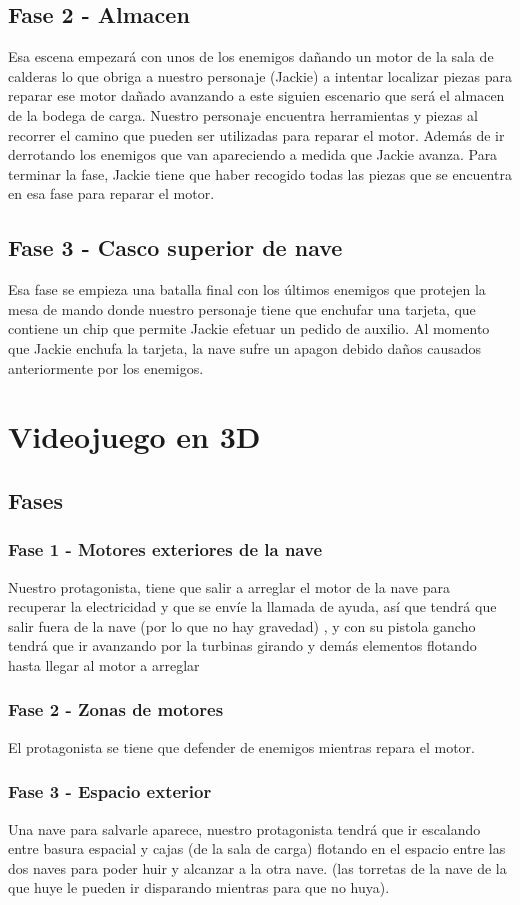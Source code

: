 \subsection{Fase 2 - Almacen}
Esa escena empezará con unos de los enemigos dañando un motor de la sala de calderas lo que obriga a nuestro personaje (Jackie) a intentar localizar piezas para reparar ese motor dañado avanzando a este siguien escenario que será el almacen de la bodega de carga.
Nuestro personaje encuentra herramientas y piezas al 
recorrer el camino que pueden ser utilizadas para reparar el motor.
Además de ir derrotando los enemigos que van apareciendo a medida que Jackie avanza.
Para terminar la fase, Jackie tiene que haber recogido todas las piezas que se encuentra en esa fase para reparar el motor.

\subsection{Fase 3 - Casco superior de nave}

Esa fase se empieza una batalla final con los últimos enemigos que protejen la mesa de mando donde nuestro personaje tiene que enchufar una tarjeta, que contiene un chip que permite Jackie efetuar un pedido de auxilio. Al momento que Jackie enchufa la tarjeta, la nave sufre un apagon debido daños causados anteriormente por los enemigos.

\section{Videojuego en 3D}

\subsection{Fases}
\subsubsection{Fase 1 - Motores exteriores de la nave}
Nuestro protagonista, tiene que salir a arreglar el motor de la nave para recuperar la electricidad y
 que se envíe la llamada de ayuda, así que tendrá que salir fuera de la nave (por lo que no hay gravedad) ,
  y con su pistola gancho tendrá que ir avanzando por la turbinas girando y demás elementos flotando
   hasta llegar al motor a arreglar 

\subsubsection{Fase 2 - Zonas de motores}
El protagonista se tiene que defender de enemigos mientras repara el motor.

\subsubsection{Fase 3 - Espacio exterior}
Una nave para salvarle aparece, nuestro protagonista tendrá que ir escalando entre basura espacial y cajas
(de la sala de carga) flotando en el espacio entre las dos naves para poder huir y alcanzar a la otra nave.
(las torretas de la nave de la que huye le pueden ir disparando mientras para que no huya).

